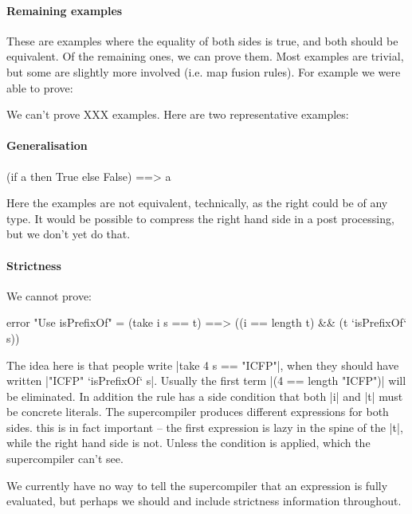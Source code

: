 \documentclass{sigplanconf}
\newcommand{\unknown}{XXX}
\begin{document}
\paragraph{Remaining examples}

These are examples where the equality of both sides is true, and both should be equivalent. Of the remaining ones, we can prove them. Most examples are trivial, but some are slightly more involved (i.e. map fusion rules). For example we were able to prove:

\begin{code}
\end{code}

We can't prove \unknown{} examples. Here are two representative examples:

\paragraph{Generalisation}

\begin{code}
(if a then True else False) ==> a
\end{code}

Here the examples are not equivalent, technically, as the right could be of any type. It would be possible to compress the right hand side in a post processing, but we don't yet do that.

\paragraph{Strictness}

We cannot prove:

\begin{code}
error "Use isPrefixOf" = (take i s == t) ==> ((i == length t) && (t `isPrefixOf` s))
\end{code}

The idea here is that people write |take 4 s == "ICFP"|, when they should have written |"ICFP" `isPrefixOf` s|. Usually the first term |(4 == length "ICFP")| will be eliminated. In addition the rule has a side condition that both |i| and |t| must be concrete literals. The supercompiler produces different expressions for both sides. this is in fact important -- the first expression is lazy in the spine of the |t|, while the right hand side is not. Unless the condition is applied, which the supercompiler can't see.

We currently have no way to tell the supercompiler that an expression is fully evaluated, but perhaps we should and include strictness information throughout.
\end{document}
